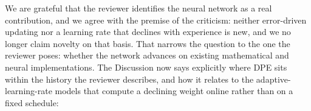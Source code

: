 We are grateful that the reviewer identifies the neural network as a real contribution, and we agree with the premise of the criticism: neither error-driven updating nor a learning rate that declines with experience is new, and we no longer claim novelty on that basis. That narrows the question to the one the reviewer poses: whether the network advances on existing mathematical and neural implementations. The Discussion now says explicitly where DPE sits within the history the reviewer describes, and how it relates to the adaptive-learning-rate models that compute a declining weight online rather than on a fixed schedule:


